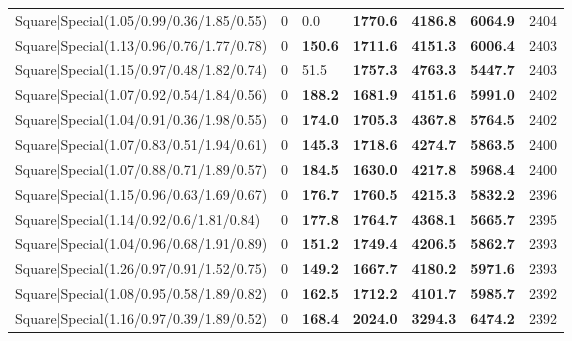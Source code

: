 \begin{tabular}{lrllllr}
 Square|Special(1.05/0.99/0.36/1.85/0.55)                      &             0   & 0.0            & \textbf{1770.6} & \textbf{4186.8} & \textbf{6064.9} &         2404 \\
 Square|Special(1.13/0.96/0.76/1.77/0.78)                      &             0   & \textbf{150.6} & \textbf{1711.6} & \textbf{4151.3} & \textbf{6006.4} &         2403 \\
 Square|Special(1.15/0.97/0.48/1.82/0.74)                      &             0   & 51.5           & \textbf{1757.3} & \textbf{4763.3} & \textbf{5447.7} &         2403 \\
 Square|Special(1.07/0.92/0.54/1.84/0.56)                      &             0   & \textbf{188.2} & \textbf{1681.9} & \textbf{4151.6} & \textbf{5991.0} &         2402 \\
 Square|Special(1.04/0.91/0.36/1.98/0.55)                      &             0   & \textbf{174.0} & \textbf{1705.3} & \textbf{4367.8} & \textbf{5764.5} &         2402 \\
 Square|Special(1.07/0.83/0.51/1.94/0.61)                      &             0   & \textbf{145.3} & \textbf{1718.6} & \textbf{4274.7} & \textbf{5863.5} &         2400 \\
 Square|Special(1.07/0.88/0.71/1.89/0.57)                      &             0   & \textbf{184.5} & \textbf{1630.0} & \textbf{4217.8} & \textbf{5968.4} &         2400 \\
 Square|Special(1.15/0.96/0.63/1.69/0.67)                      &             0   & \textbf{176.7} & \textbf{1760.5} & \textbf{4215.3} & \textbf{5832.2} &         2396 \\
 Square|Special(1.14/0.92/0.6/1.81/0.84)                       &             0   & \textbf{177.8} & \textbf{1764.7} & \textbf{4368.1} & \textbf{5665.7} &         2395 \\
 Square|Special(1.04/0.96/0.68/1.91/0.89)                      &             0   & \textbf{151.2} & \textbf{1749.4} & \textbf{4206.5} & \textbf{5862.7} &         2393 \\
 Square|Special(1.26/0.97/0.91/1.52/0.75)                      &             0   & \textbf{149.2} & \textbf{1667.7} & \textbf{4180.2} & \textbf{5971.6} &         2393 \\
 Square|Special(1.08/0.95/0.58/1.89/0.82)                      &             0   & \textbf{162.5} & \textbf{1712.2} & \textbf{4101.7} & \textbf{5985.7} &         2392 \\
 Square|Special(1.16/0.97/0.39/1.89/0.52)                      &             0   & \textbf{168.4} & \textbf{2024.0} & \textbf{3294.3} & \textbf{6474.2} &         2392 \\

\end{tabular}
